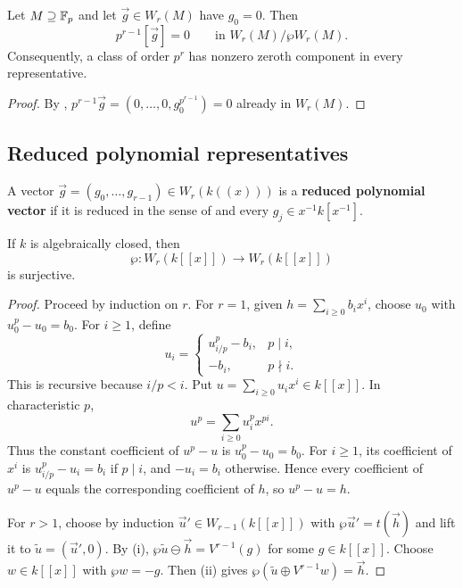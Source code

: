 \begin{cor}\label{cor:asw_class_order_and_first_component}
Let $M\supseteq\mathbb{F}_p$ and let $\vec g\in W_r(M)$ have $g_0=0$. Then
\[
p^{r-1}[\vec g]=0 \qquad\text{in } W_r(M)/\wp W_r(M).
\]
Consequently, a class of
order $p^r$ has nonzero zeroth component in every representative.
\end{cor}

\begin{proof}
By ,
$p^{r-1}\vec g=(0,\dots,0,g_0^{p^{r-1}})=0$ already in $W_r(M)$.
\end{proof}

\subsection{Reduced polynomial representatives}

\begin{definition}\label{definition:reduced_polynomial_vector}
A vector $\vec g=(g_0,\dots,g_{r-1})\in W_r(k((x)))$ is a
\textbf{reduced polynomial vector} if it is reduced in the sense of
 and every
$g_j\in x^{-1}k[x^{-1}]$.
\end{definition}

\begin{lemma}
\label{lemma:wp_surjective_on_integral_witt}
If $k$ is algebraically closed, then
\[
\wp:W_r(k[[x]])\longrightarrow W_r(k[[x]])
\]
is surjective.
\end{lemma}

\begin{proof}
Proceed by induction on $r$. For $r=1$, given
$h=\sum_{i\geq0}b_ix^i$, choose $u_0$ with
$u_0^p-u_0=b_0$. For $i\geq1$, define
\[
u_i=
\begin{cases}
u_{i/p}^p-b_i,& p\mid i,\\
-b_i,& p\nmid i.
\end{cases}
\]
This is recursive because $i/p<i$. Put
$u=\sum_{i\geq0}u_ix^i\in k[[x]]$. In characteristic $p$,
\[
u^p=\sum_{i\geq0}u_i^p x^{pi}.
\]
Thus the constant coefficient of $u^p-u$ is $u_0^p-u_0=b_0$.
For $i\geq1$, its coefficient of $x^i$ is $u_{i/p}^p-u_i=b_i$
if $p\mid i$, and $-u_i=b_i$ otherwise. Hence every coefficient
of $u^p-u$ equals the corresponding coefficient of $h$, so $u^p-u=h$.

For $r>1$, choose by induction $\vec u'\in W_{r-1}(k[[x]])$ with
$\wp\vec u'=t(\vec h)$ and lift it to
$\widetilde u=(\vec u',0)$. By (i),
$\wp\widetilde u\ominus\vec h=V^{r-1}(g)$ for some $g\in k[[x]]$.
Choose $w\in k[[x]]$ with $\wp w=-g$. Then
(ii) gives
$\wp(\widetilde u\oplus V^{r-1}w)=\vec h$.
\end{proof}

